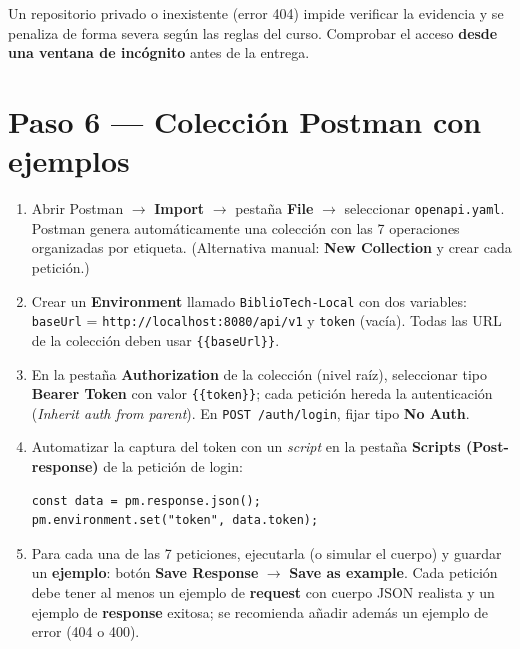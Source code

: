 \documentclass[11pt,a4paper]{article}
\begin{document}
\begin{cajaalerta}
Un repositorio privado o inexistente (error 404) impide verificar la evidencia y se penaliza de forma severa según las reglas del curso. Comprobar el acceso \textbf{desde una ventana de incógnito} antes de la entrega.
\end{cajaalerta}

\section{Paso 6 --- Colección Postman con ejemplos}

\begin{cajapaso}
\begin{enumerate}
  \item Abrir Postman $\rightarrow$ \textbf{Import} $\rightarrow$ pestaña \textbf{File} $\rightarrow$ seleccionar \texttt{openapi.yaml}. Postman genera automáticamente una colección con las 7 operaciones organizadas por etiqueta. (Alternativa manual: \textbf{New Collection} y crear cada petición.)
  \item Crear un \textbf{Environment} llamado \texttt{BiblioTech-Local} con dos variables: \texttt{baseUrl} = \texttt{http://localhost:8080/api/v1} y \texttt{token} (vacía). Todas las URL de la colección deben usar \texttt{\{\{baseUrl\}\}}.
  \item En la pestaña \textbf{Authorization} de la colección (nivel raíz), seleccionar tipo \textbf{Bearer Token} con valor \texttt{\{\{token\}\}}; cada petición hereda la autenticación (\textit{Inherit auth from parent}). En \texttt{POST /auth/login}, fijar tipo \textbf{No Auth}.
  \item Automatizar la captura del token con un \textit{script} en la pestaña \textbf{Scripts (Post-response)} de la petición de login:
\begin{lstlisting}[numbers=none]
const data = pm.response.json();
pm.environment.set("token", data.token);
\end{lstlisting}
  \item Para cada una de las 7 peticiones, ejecutarla (o simular el cuerpo) y guardar un \textbf{ejemplo}: botón \textbf{Save Response} $\rightarrow$ \textbf{Save as example}. Cada petición debe tener al menos un ejemplo de \textbf{request} con cuerpo JSON realista y un ejemplo de \textbf{response} exitosa; se recomienda añadir además un ejemplo de error (404 o 400).
\end{enumerate}
\end{cajapaso}
\end{document}

